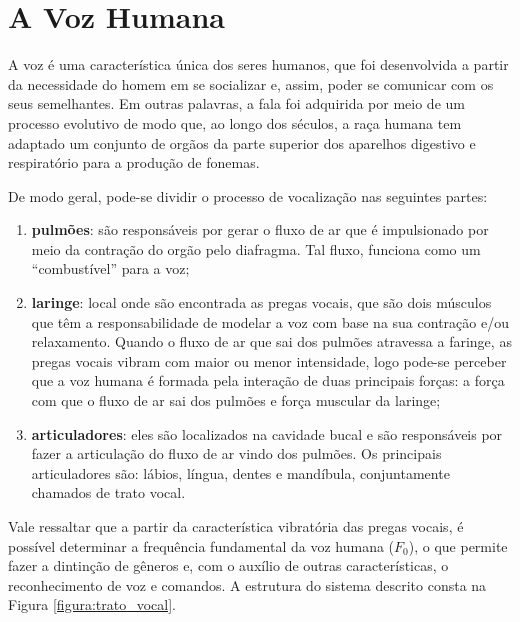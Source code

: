 \documentclass[a4paper,12pt,twoside,openright]{report}
\begin{document}
\section{A Voz Humana}
\label{voz_humana}
\par A voz \'{e} uma caracter\'{i}stica \'{u}nica dos seres humanos, que foi desenvolvida a partir da necessidade do homem em se socializar e, assim, poder se comunicar com os seus semelhantes. Em outras palavras, a fala foi adquirida por meio de um processo evolutivo de modo que, ao longo dos s\'{e}culos, a ra\c{c}a humana tem adaptado um conjunto de org\~{a}os da parte superior dos aparelhos digestivo e respirat\'{o}rio para a produ{\c c}\~{a}o de fonemas.
\\
\par De modo geral, pode-se dividir o processo de vocaliza\c{c}\~{a}o nas seguintes partes: 
\begin{enumerate}
\item{} \textbf{pulm\~{o}es}: s\~{a}o respons\'{a}veis por gerar o fluxo de ar que \'{e} impulsionado por meio da contra{\c c}\~{a}o do org\~{a}o pelo diafragma. Tal fluxo, funciona como um ``combust\'{i}vel'' para a voz;
\item{} \textbf{laringe}: local onde s\~{a}o encontrada as pregas vocais, que s\~{a}o dois m\'{u}sculos que t\^{e}m a responsabilidade de modelar a voz com base na sua contra{\c c}\~{a}o e/ou relaxamento. Quando o fluxo de ar que sai dos pulm\~{o}es atravessa a faringe, as pregas vocais vibram com maior ou menor intensidade, logo pode-se perceber que a voz humana \'{e} formada pela intera{\c c}\~{a}o de duas principais for{\c c}as: a for{\c c}a com que o fluxo de ar sai dos pulm\~{o}es e for{\c c}a muscular da laringe;
\item{} \textbf{articuladores}: eles s\~{a}o localizados na cavidade bucal e s\~{a}o respons\'{a}veis por fazer a articula{\c c}\~{a}o do fluxo de ar vindo dos pulm\~{o}es. Os principais articuladores s\~{a}o: l\'{a}bios, l\'{i}ngua, dentes e mand\'{i}bula, conjuntamente chamados de trato vocal.
\end{enumerate}
\par Vale ressaltar que a partir da caracter\'{i}stica vibrat\'{o}ria das pregas vocais, \'{e} poss\'{i}vel determinar a frequ\^{e}ncia fundamental da voz humana ($F_0$), o que permite fazer a dintin{\c c}\~{a}o de g\^{e}neros e, com o aux\'{i}lio de outras caracter\'{i}sticas, o reconhecimento de voz e comandos. A estrutura do sistema descrito consta na Figura \ref{figura:trato_vocal}.
\end{document}
